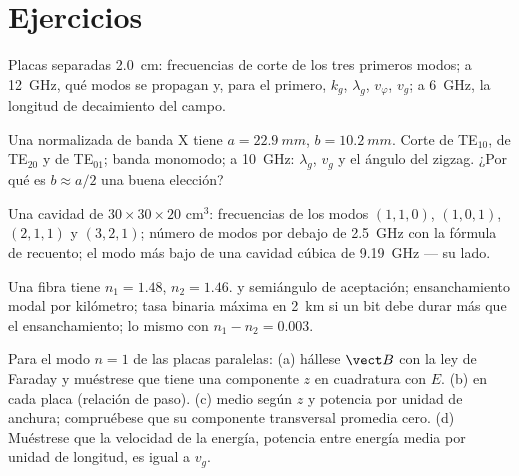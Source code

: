 \section{Ejercicios}

\begin{exercise}[$\star$]\label{exo:b2:guided-waves:1}
Placas separadas \qty{2.0}{cm}: frecuencias de corte de los tres primeros modos;
a \qty{12}{GHz}, qué modos se propagan y, para el primero, $k_g$,
$\lambda_g$, $v_\varphi$, $v_g$; a \qty{6}{GHz}, la longitud de decaimiento del campo.
\end{exercise}

\begin{exercise}[$\star$]\label{exo:b2:guided-waves:2}
Una  normalizada de banda X tiene $a = \qty{22.9}{mm}$, $b = \qty{10.2}{mm}$.
Corte de TE$_{10}$, de TE$_{20}$ y de TE$_{01}$; banda monomodo; a
\qty{10}{GHz}: $\lambda_g$, $v_g$ y el ángulo del zigzag. ¿Por qué es $b \approx a/2$
una buena elección?
\end{exercise}

\begin{exercise}[$\star$]\label{exo:b2:guided-waves:3}
Una cavidad de $30 \times 30 \times 20$ cm$^3$: frecuencias de los modos $(1,1,0)$,
$(1,0,1)$, $(2,1,1)$ y $(3,2,1)$; número de modos por debajo de \qty{2.5}{GHz} con
la fórmula de recuento; el modo más bajo de una cavidad cúbica de \qty{9.19}{GHz}
--- su lado.
\end{exercise}

\begin{exercise}[$\star$]\label{exo:b2:guided-waves:4}
Una fibra tiene $n_1 = 1.48$, $n_2 = 1.46$.  y semiángulo
de aceptación; ensanchamiento modal por kilómetro; tasa binaria máxima en
\qty{2}{km} si un bit debe durar más que el ensanchamiento; lo mismo con
$n_1 - n_2 = 0.003$.
\end{exercise}

\begin{exercise}[$\star\star$]\label{exo:b2:guided-waves:5}
Para el modo $n = 1$ de las placas paralelas: (a) hállese $\vect B$ con la ley de
Faraday y muéstrese que tiene una componente $z$ en cuadratura con $E$. (b)  en cada placa (relación de paso). (c)  medio
según $z$ y potencia por unidad de anchura; compruébese que su componente
transversal promedia cero. (d) Muéstrese que la velocidad de la energía, potencia
entre energía media por unidad de longitud, es igual a $v_g$.
\end{exercise}

